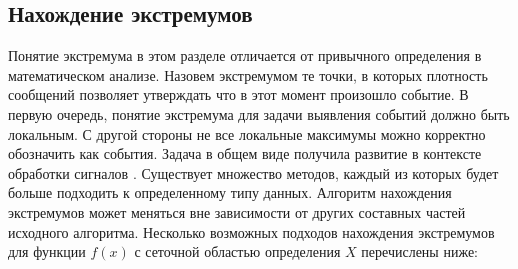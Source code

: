 \documentclass[12pt, a4paper]{article}
\begin{document}
  \subsection{Нахождение экстремумов}
  Понятие экстремума в этом разделе отличается от привычного определения в математическом анализе. Назовем экстремумом те точки, в которых плотность сообщений позволяет утверждать что в этот момент произошло событие. В первую очередь, понятие экстремума для задачи выявления событий должно быть локальным. С другой стороны не все локальные максимумы можно корректно обозначить как события. Задача в общем виде получила развитие в контексте обработки сигналов \cite{peak-detection}. Существует множество методов, каждый из которых будет больше подходить к определенному типу данных. Алгоритм нахождения экстремумов может меняться вне зависимости от других составных частей исходного алгоритма. Несколько возможных подходов нахождения экстремумов для функции $f(x)$ с сеточной областью определения $X$ перечислены ниже:
\end{document}
